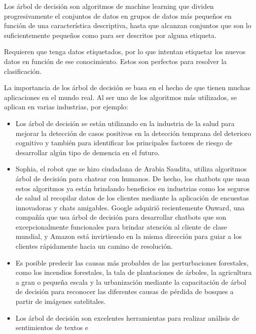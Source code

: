\documentclass[12pt, fleqn]{report}                             %
\theoremstyle{break}                                            %
\begin{document}
        Los árbol de decisión son algoritmos de machine learning que dividen progresivamente el 
        conjuntos de datos en grupos de datos más pequeños en función de una característica descriptiva, 
        hasta que alcanzan conjuntos que son lo suficientemente pequeños como para ser descritos por alguna etiqueta. 
        
        Requieren que tenga datos etiquetados, por lo que intentan etiquetar los nuevos datos en función de ese conocimiento.
        Estos son perfectos para resolver la clasificación.

        La importancia de los árbol de decisión se basa en el hecho de que tienen muchas aplicaciones en el mundo real. 
        Al ser uno de los algoritmos más utilizados, se aplican en varias industrias, por ejemplo:
        \begin{itemize}
            \item Los árbol de decisión se están utilizando en la industria de la salud para mejorar la detección 
            de casos positivos en la detección temprana del deterioro cognitivo y también para identificar los principales
            factores de riesgo de desarrollar algún tipo de demencia en el futuro.
            \item Sophia, el robot que se hizo ciudadana de Arabia Saudita, utiliza algoritmos árbol de decisión para 
            chatear con humanos. 
            De hecho, los chatbots que usan estos algoritmos ya están brindando beneficios en industrias como 
            los seguros de salud al recopilar datos de los clientes mediante la aplicación de encuestas innovadoras y chats amigables.
            Google adquirió recientemente Onward, una compañía que usa árbol de decisión para desarrollar chatbots
             que son excepcionalmente funcionales para brindar atención al cliente de clase mundial, y Amazon está 
             invirtiendo en la misma dirección para guiar a los clientes rápidamente hacia un camino de resolución.
            \item Es posible predecir las causas más probables de las perturbaciones forestales, como los incendios forestales, 
            la tala de plantaciones de árboles, la agricultura a gran o pequeña escala y la
            urbanización mediante la capacitación de árbol de decisión para reconocer las diferentes causas
            de pérdida de bosques a partir de imágenes satelitales.
            \item Los árbol de decisión son excelentes herramientas para realizar análisis de sentimientos de textos e 

\end{itemize}
\end{document}
